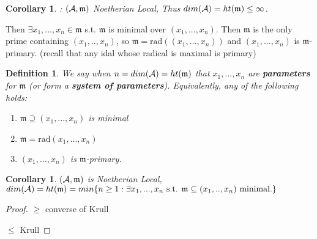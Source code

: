 \documentclass[11pt]{article}
\newtheorem{cor}[thm]{Corollary}
\newtheorem{dfn}[thm]{Definition}
\newcommand{\scm}{{\mathfrak m}}
\newcommand{\cala}{{\cal A}}
\begin{document}
\begin{cor}: $(\cala,\scm)$ Noetherian Local, Thus $dim(\cala)=ht(\scm)\leq \infty$.
\end{cor}
Then $\exists x_1,...,x_n\in\scm$ s.t. $\scm$ is minimal over $(x_1,...,x_n)$. Then $\scm$ is the only prime containing $(x_1,..,x_n)$, so $\scm=\text{rad}((x_1,...,x_n))$ and $(x_1,...,x_n)$ is $\scm$-primary. (recall that any idal whose radical is maximal is primary)

\begin{dfn}
We say when $n=dim(\cala)=ht(\scm)$ that $x_1,...,x_n$ are \textbf{parameters} for $\scm$ (or form a \textbf{system of parameters}). Equivalently, any of the following holds:
\begin{enumerate}[label=(\roman*)]
\item $\scm\supseteq (x_1,...,x_n)$ is minimal
\item $\scm=\text{rad}(x_1,...,x_n)$
\item $(x_1,...,x_n)$ is $\scm$-primary.
\end{enumerate}
\end{dfn}

\begin{cor}
$(\cala,\scm)$ is Noetherian Local, $dim(\cala)=ht(\scm)=min\{n\geq 1:\exists x_1,...,x_n\text{ s.t. }\scm\subseteq (x_1,..,x_n)\text{ minimal.}\}$
\end{cor}
\begin{proof}
$\geq$ converse of Krull

$\leq $ Krull
\end{proof}
\end{document}
